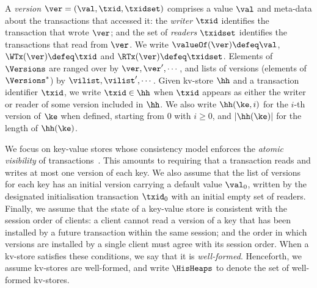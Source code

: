 A \emph{version} $\ver = (\val, \txid, \txidset)$ comprises  a value $\val$
and meta-data about the transactions that accessed it: the \emph{writer} $\txid$ identifies the transaction that wrote $\ver$;
and the set of \emph{readers} $\txidset$ identifies  the  transactions
that read from  $\ver$.
We write $\valueOf(\ver) \defeq \val$,
$\WTx(\ver) \defeq \txid$ and $\RTx(\ver) \defeq \txidset$. 
 Elements of $\Versions$ are ranged over by
$\ver, \ver',  \cdots$, and lists of versions (elements of $\Versions^{\ast}$) by $\vilist, \vilist',\cdots$.
Given kv-store $\hh$ and a transaction identifier $\txid$, we write 
$\txid \in \hh$ when $\txid$ appears as either the writer or reader of 
some version included in $\hh$.
We also write 
$\hh(\ke, i)$ for the   $i$-th version of $\ke$ when defined, starting
from $0$ with  $i \geq 0$,   and $\lvert \hh(\ke) \rvert$ for   the length of
$\hh(\ke)$. 




We focus on key-value stores whose consistency model enforces the \emph{atomic visibility} of transactions~\cite{framework-concur}. 
This amounts to requiring that a transaction reads and writes at most
one version of each key.
We also assume that the list of versions for each key has an initial version carrying a default value $\val_0$, 
written by the designated initialisation transaction $\txid_0$ with an initial
empty set of readers.
Finally, we assume that the state of a key-value store is consistent with 
the session order of clients: a client cannot read a version of a key that has 
been installed by a future transaction within the same session;  and 
the order in which versions are installed by a single client must agree 
with its session order. When a 
kv-store satisfies  these conditions, we say that it is
\emph{well-formed}. 
Henceforth, we assume kv-stores are well-formed, and write  $\HisHeaps$ to denote 
the set of well-formed kv-stores.




